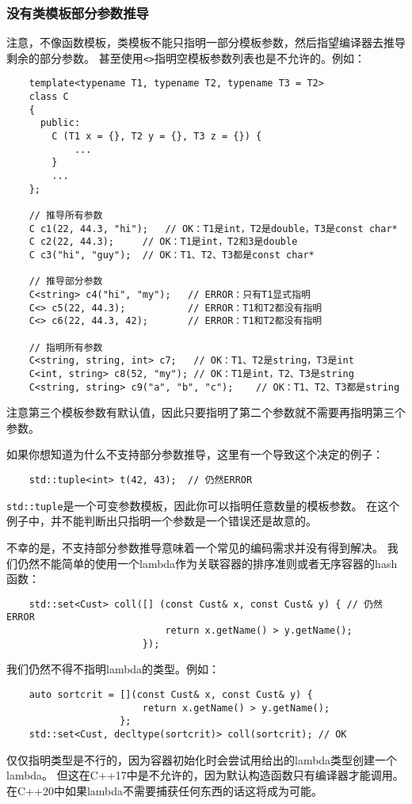 \subsubsection{没有类模板部分参数推导}
注意，不像函数模板，类模板不能只指明一部分模板参数，然后指望编译器去推导剩余的部分参数。
甚至使用\texttt{<>}指明空模板参数列表也是不允许的。例如：
\begin{lstlisting}
    template<typename T1, typename T2, typename T3 = T2>
    class C
    {
      public:
        C (T1 x = {}, T2 y = {}, T3 z = {}) {
            ...
        }
        ...
    };

    // 推导所有参数
    C c1(22, 44.3, "hi");   // OK：T1是int，T2是double，T3是const char*
    C c2(22, 44.3);     // OK：T1是int，T2和3是double
    C c3("hi", "guy");  // OK：T1、T2、T3都是const char*

    // 推导部分参数
    C<string> c4("hi", "my");   // ERROR：只有T1显式指明
    C<> c5(22, 44.3);           // ERROR：T1和T2都没有指明
    C<> c6(22, 44.3, 42);       // ERROR：T1和T2都没有指明

    // 指明所有参数
    C<string, string, int> c7;   // OK：T1、T2是string，T3是int
    C<int, string> c8(52, "my"); // OK：T1是int，T2、T3是string
    C<string, string> c9("a", "b", "c");    // OK：T1、T2、T3都是string
\end{lstlisting}
注意第三个模板参数有默认值，因此只要指明了第二个参数就不需要再指明第三个参数。

如果你想知道为什么不支持部分参数推导，这里有一个导致这个决定的例子：
\begin{lstlisting}
    std::tuple<int> t(42, 43);  // 仍然ERROR
\end{lstlisting}
\texttt{std::tuple}是一个可变参数模板，因此你可以指明任意数量的模板参数。
在这个例子中，并不能判断出只指明一个参数是一个错误还是故意的。

不幸的是，不支持部分参数推导意味着一个常见的编码需求并没有得到解决。
我们仍然不能简单的使用一个lambda作为关联容器的排序准则或者无序容器的hash函数：
\begin{lstlisting}
    std::set<Cust> coll([] (const Cust& x, const Cust& y) { // 仍然ERROR
                            return x.getName() > y.getName();
                        });
\end{lstlisting}
我们仍然不得不指明lambda的类型。例如：
\begin{lstlisting}
    auto sortcrit = [](const Cust& x, const Cust& y) {
                        return x.getName() > y.getName();
                    };
    std::set<Cust, decltype(sortcrit)> coll(sortcrit); // OK
\end{lstlisting}
仅仅指明类型是不行的，因为容器初始化时会尝试用给出的lambda类型创建一个lambda。
但这在C++17中是不允许的，因为默认构造函数只有编译器才能调用。
在C++20中如果lambda不需要捕获任何东西的话这将成为可能。

